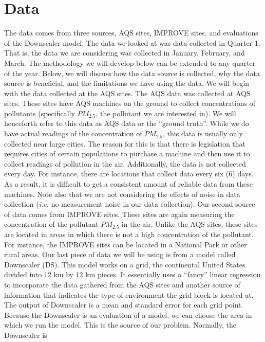 \documentclass[10pt]{article}
\begin{document}
\section{Data}
\justify
The data comes from three sources, AQS sites, IMPROVE sites, and evaluations of the Downscaler model.  The data we looked at was data collected in Quarter 1.  That is, the data we are considering was collected in January, February, and March.  The methodology we will develop below can be extended to any quarter of the year.  Below, we will discuss how the data source is collected, why the data source is beneficial, and the limitations we have using the data.  We will begin with the data collected at the AQS sites. 
\justify
The AQS data was collected at AQS sites.  These sites have AQS machines on the ground to collect concentrations of pollutants (specifically $PM_{2.5}$, the pollutant we are interested in).  We will henceforth refer to this data as AQS data  or the ``ground truth''.  While we do have actual readings of the concentration of $PM_{2.5}$, this data is usually only collected near large cities.  The reason for this is that there is legislation that requires cities of certain populations to purchase a machine and then use it to collect readings of pollution in the air.  Additionally, the data is not collected every day.  For instance, there are locations that collect data every six (6) days.  As a result, it is difficult to get a consistent amount of reliable data from these machines.  Note also that we are not considering the effects of noise in data collection (\textit{i.e.} no measurement noise in our data collection).
\justify
Our second source of data comes from IMPROVE sites.  These sites are again measuring the concentration of the pollutant $PM_{2.5}$ in the air.  Unlike the AQS sites, these sites are located in areas in which there is not a high concentration of the pollutant.  For instance, the IMPROVE sites can be located in a National Park or other rural areas.
\justify
Our last piece of data we will be using is from a model called Downscaler (DS).  This model works on a grid, the continental United States divided into 12 km by 12 km pieces.  It essentially uses a ``fancy'' linear regression to incorporate the data gathered from the AQS sites and another source of information that indicates the type of environment the grid block is located at.  The output of Downscaler is a mean and standard error for each grid point.  Because the Downscaler is an evaluation of a model, we can choose the area in which we run the model. This is the source of our problem.  Normally, the Downscaler is 
\end{document}
